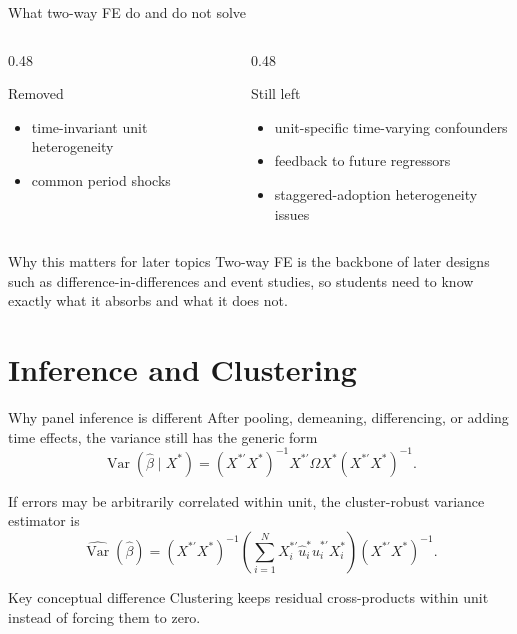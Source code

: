 \documentclass[10pt]{beamer}
\DeclareMathOperator{\Var}{Var}
\begin{document}
\begin{frame}{What two-way FE do and do not solve}
\label{slide:twfelimits}
\small
\begin{columns}[T]
\begin{column}{0.48\textwidth}
\begin{block}{Removed}
\begin{itemize}
  \item time-invariant unit heterogeneity
  \item common period shocks
\end{itemize}
\end{block}
\end{column}
\begin{column}{0.48\textwidth}
\begin{alertblock}{Still left}
\begin{itemize}
  \item unit-specific time-varying confounders
  \item feedback to future regressors
  \item staggered-adoption heterogeneity issues
\end{itemize}
\end{alertblock}
\end{column}
\end{columns}

\pause
\begin{block}{Why this matters for later topics}
Two-way FE is the backbone of later designs such as difference-in-differences and event studies, so students need to know exactly what it absorbs and what it does not.
\end{block}
\end{frame}

\section{Inference and Clustering}

\begin{frame}{Why panel inference is different}
\label{slide:cluster}
\small
After pooling, demeaning, differencing, or adding time effects, the variance still has the generic form
\[
\Var(\hat{\beta}\mid X^{\ast})
=
\left(X^{\ast\prime}X^{\ast}\right)^{-1}
X^{\ast\prime}\Omega X^{\ast}
\left(X^{\ast\prime}X^{\ast}\right)^{-1}.
\]

\pause
If errors may be arbitrarily correlated within unit, the cluster-robust variance estimator is
\[
\widehat{\Var}(\hat{\beta})
=
\left(X^{\ast\prime}X^{\ast}\right)^{-1}
\left(\sum_{i=1}^N X_i^{\ast\prime}\hat{u}_i^{\ast}\hat{u}_i^{\ast\prime}X_i^{\ast}\right)
\left(X^{\ast\prime}X^{\ast}\right)^{-1}.
\]

\pause
\begin{alertblock}{Key conceptual difference}
Clustering keeps residual cross-products within unit instead of forcing them to zero.
\end{alertblock}
\end{frame}
\end{document}
